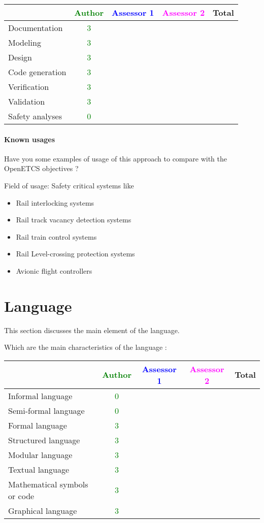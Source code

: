 \begin{tabular}{|l | c | c | c | c|}
\hline
& \textcolor{green}{Author} & \textcolor{blue}{Assessor 1} & \textcolor{magenta}{Assessor 2} & Total \\
\hline 
Documentation &  \textcolor{green}{3}  & & &  \\
\hline
Modeling &  \textcolor{green}{3}  & & &  \\
\hline
Design &  \textcolor{green}{3}  & & & \\
\hline
Code generation &  \textcolor{green}{3}  & & & \\
\hline
Verification &  \textcolor{green}{3}  & & & \\
\hline
Validation &  \textcolor{green}{3}  & & & \\
\hline
Safety analyses &  \textcolor{green}{0}  & & & \\
\hline
\end{tabular}

\paragraph{Known usages} Have you some examples of usage of this approach to  compare with the OpenETCS objectives ?

Field of usage: Safety critical systems like
\begin{itemize}
	\item Rail interlocking systems
	\item Rail track vacancy detection systems
	\item Rail train control systems
	\item Rail Level-crossing protection systems
	\item Avionic flight controllers
\end{itemize}

\section{Language}
This section discusses the main element of the language.

Which are the main characteristics of the language :

\begin{tabular}{|l | c | c | c | c|}
\hline
& \textcolor{green}{Author} & \textcolor{blue}{Assessor 1} & \textcolor{magenta}{Assessor 2} & Total \\
\hline 
Informal language &  \textcolor{green}{0}  & & &  \\
\hline 
Semi-formal language &  \textcolor{green}{0}  & & &  \\
\hline
Formal language &  \textcolor{green}{3}  & & &  \\
\hline
Structured language &  \textcolor{green}{3}  & & & \\
\hline
Modular language &  \textcolor{green}{3}  & & & \\
\hline
Textual language & \textcolor{green}{3} & & & \\
\hline
Mathematical symbols or code & \textcolor{green}{3} & & & \\
\hline
Graphical language & \textcolor{green}{3} & & & \\
\hline
\end{tabular}


